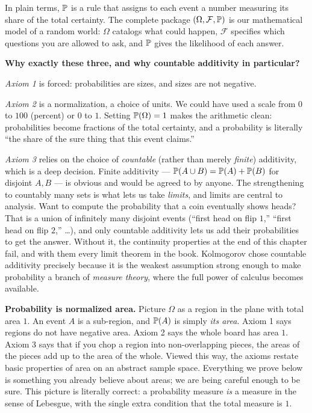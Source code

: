 In plain terms, $\P$ is a rule that assigns to each event a number measuring its
share of the total certainty. The complete package $(\Omega, \mathcal{F}, \P)$ is
our mathematical model of a random world: $\Omega$ catalogs what could happen,
$\mathcal{F}$ specifies which questions you are allowed to ask, and $\P$ gives
the likelihood of each answer.



\begin{whybox}
\textbf{Why exactly these three, and why countable additivity in particular?}

\emph{Axiom 1} is forced: probabilities are sizes, and sizes are not negative.

\emph{Axiom 2} is a normalization, a choice of units. We could have used a scale
from $0$ to $100$ (percent) or $0$ to $1$. Setting $\P(\Omega) = 1$ makes the
arithmetic clean: probabilities become fractions of the total certainty, and a
probability is literally ``the share of the sure thing that this event claims.''

\emph{Axiom 3} relies on the choice of \emph{countable} (rather
than merely \emph{finite}) additivity, which is a deep decision. Finite
additivity --- $\P(A \cup B) = \P(A) + \P(B)$ for disjoint $A, B$ --- is obvious
and would be agreed to by anyone. The strengthening to countably many sets is
what lets us take \emph{limits}, and limits are central to analysis. Want
to compute the probability that a coin eventually shows heads? That is a union of
infinitely many disjoint events (``first head on flip $1$,'' ``first head on flip
$2$,'' \dots), and only countable additivity lets us add their probabilities to
get the answer. Without it, the continuity properties at the end of this chapter
fail, and with them every limit theorem in the book. Kolmogorov chose countable
additivity precisely because it is the weakest assumption strong enough to make
probability a branch of \emph{measure theory}, where the full power of calculus
becomes available.
\end{whybox}

\begin{happeningbox}
\textbf{Probability is normalized area.} Picture $\Omega$ as a region in the
plane with total area $1$. An event $A$ is a sub-region, and $\P(A)$ is simply
\emph{its area}. Axiom 1 says regions do not have negative area. Axiom 2 says the
whole board has area $1$. Axiom 3 says that if you chop a region into
non-overlapping pieces, the areas of the pieces add up to the area of the whole.
Viewed this way, the axioms restate basic properties of area on an abstract sample space. Everything we prove
below is something you already believe about areas; we are being careful
enough to be sure. This picture is literally correct: a probability measure
\emph{is} a measure in the sense of Lebesgue, with the single extra condition
that the total measure is $1$.
\end{happeningbox}

